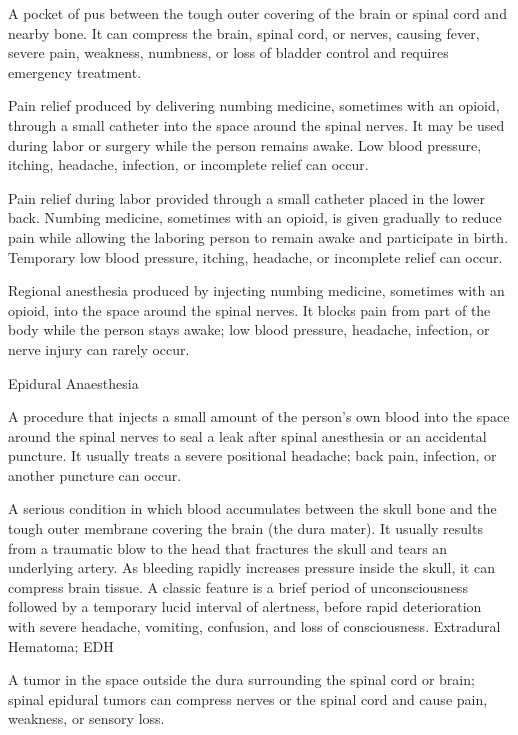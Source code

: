  A pocket of pus between the tough outer covering of the brain or spinal cord and nearby bone. It can compress the brain, spinal cord, or nerves, causing fever, severe pain, weakness, numbness, or loss of bladder control and requires emergency treatment.

 Pain relief produced by delivering numbing medicine, sometimes with an opioid, through a small catheter into the space around the spinal nerves. It may be used during labor or surgery while the person remains awake. Low blood pressure, itching, headache, infection, or incomplete relief can occur.

 Pain relief during labor provided through a small catheter placed in the lower back. Numbing medicine, sometimes with an opioid, is given gradually to reduce pain while allowing the laboring person to remain awake and participate in birth. Temporary low blood pressure, itching, headache, or incomplete relief can occur.

 Regional anesthesia produced by injecting numbing medicine, sometimes with an opioid, into the space around the spinal nerves. It blocks pain from part of the body while the person stays awake; low blood pressure, headache, infection, or nerve injury can rarely occur.

\synonyms
Epidural Anaesthesia

 A procedure that injects a small amount of the person’s own blood into the space around the spinal nerves to seal a leak after spinal anesthesia or an accidental puncture. It usually treats a severe positional headache; back pain, infection, or another puncture can occur.

 A serious condition in which blood accumulates between the skull bone and the tough outer membrane covering the brain (the dura mater). It usually results from a traumatic blow to the head that fractures the skull and tears an underlying artery. As bleeding rapidly increases pressure inside the skull, it can compress brain tissue. A classic feature is a brief period of unconsciousness followed by a temporary lucid interval of alertness, before rapid deterioration with severe headache, vomiting, confusion, and loss of consciousness.
\synonyms
Extradural Hematoma; EDH

 A tumor in the space outside the dura surrounding the spinal cord or brain; spinal epidural tumors can compress nerves or the spinal cord and cause pain, weakness, or sensory loss.

